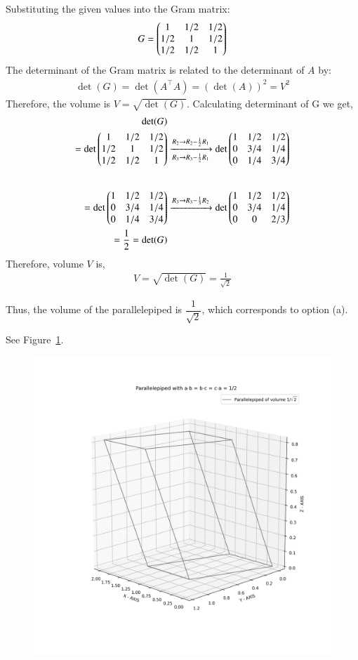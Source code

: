 \documentclass[journal]{IEEEtran}
\begin{document}
Substituting the given values into the Gram matrix:
\begin{align}
    G = \begin{pmatrix}1 & 1/2 & 1/2 \\ 1/2 & 1 & 1/2 \\ 1/2 & 1/2 & 1\end{pmatrix}
\end{align}
The determinant of the Gram matrix is related to the determinant of $A$ by:
\begin{align}
    \det(G) = 
    \det(A^\top A) = (\det(A))^2 = V^2
\end{align}
Therefore, the volume is $V = \sqrt{\det(G)}$.
Calculating determinant of G we get,
\begin{align}
    \det(G) & \\
    =\det\myvec{
1 & 1/2 & 1/2 \\
1/2 & 1 & 1/2 \\
1/2 & 1/2 & 1
}
& \xrightarrow[R_3 \to R_3 - \frac{1}{2}R_1]{R_2 \to R_2 - \frac{1}{2}R_1}
\det\myvec{
1 & 1/2 & 1/2 \\
0 & 3/4 & 1/4 \\
0 & 1/4 & 3/4
}
\\[2em] %
= \det\myvec{
1 & 1/2 & 1/2 \\
0 & 3/4 & 1/4 \\
0 & 1/4 & 3/4
}
& \xrightarrow{R_3 \to R_3 - \frac{1}{3}R_2}
\det\myvec{
1 & 1/2 & 1/2 \\
0 & 3/4 & 1/4 \\
0 & 0 & 2/3
} \\
 = \frac{1}{2} = \det(G)
\end{align}
Therefore, volume $V$ is,
\begin{align}
    V = \sqrt{\det(G)}  = \frac{1}{\sqrt{2}}
\end{align}

Thus, the volume of the parallelepiped is $\dfrac{1}{\sqrt{2}}$, which corresponds to option (a).

See Figure~\ref{fig:3DVectors}.

\begin{figure}[h!]
    \centering
    \includegraphics[width=1.0\linewidth]{figs/fig.png}
    \caption{}
    \label{fig:3DVectors}
\end{figure}
\end{document}
